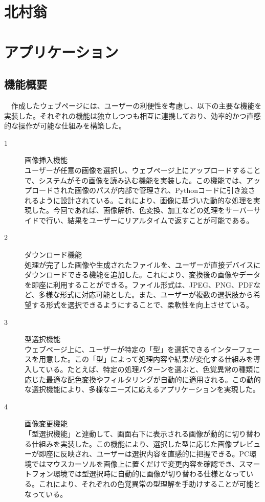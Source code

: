 \section{北村翁}
\section{アプリケーション}
\subsection{機能概要}
　作成したウェブページには、ユーザーの利便性を考慮し、以下の主要な機能を実装した。それぞれの機能は独立しつつも相互に連携しており、効率的かつ直感的な操作が可能な仕組みを構築した。
\begin{description}
  \item[1] 画像挿入機能\\
  ユーザーが任意の画像を選択し、ウェブページ上にアップロードすることで、システムがその画像を読み込む機能を実装した。この機能では、アップロードされた画像のパスが内部で管理され、Pythonコードに引き渡されるように設計されている。これにより、画像に基づいた動的な処理を実現した。今回であれば、画像解析、色変換、加工などの処理をサーバーサイドで行い、結果をユーザーにリアルタイムで返すことが可能である。\\
  \item[2] ダウンロード機能\\
  処理が完了した画像や生成されたファイルを、ユーザーが直接デバイスにダウンロードできる機能を追加した。これにより、変換後の画像やデータを即座に利用することができる。ファイル形式は、JPEG、PNG、PDFなど、多様な形式に対応可能とした。また、ユーザーが複数の選択肢から希望する形式を選択できるようにすることで、柔軟性を向上させている。\\
  \item[3] 型選択機能\\
  ウェブページ上に、ユーザーが特定の「型」を選択できるインターフェースを用意した。この「型」によって処理内容や結果が変化する仕組みを導入している。たとえば、特定の処理パターンを選ぶと、色覚異常の種類に応じた最適な配色変換やフィルタリングが自動的に適用される。この動的な選択機能により、多様なニーズに応えるアプリケーションを実現した。\\
  \item[4] 画像変更機能\\
  「型選択機能」と連動して、画面右下に表示される画像が動的に切り替わる仕組みを実装した。この機能により、選択した型に応じた画像プレビューが即座に反映され、ユーザーは選択内容を直感的に把握できる。PC環境ではマウスカーソルを画像上に置くだけで変更内容を確認でき、スマートフォン環境では型選択時に自動的に画像が切り替わる仕様となっている。これにより、それぞれの色覚異常の型理解を手助けすることが可能となっている。
\end{description}
